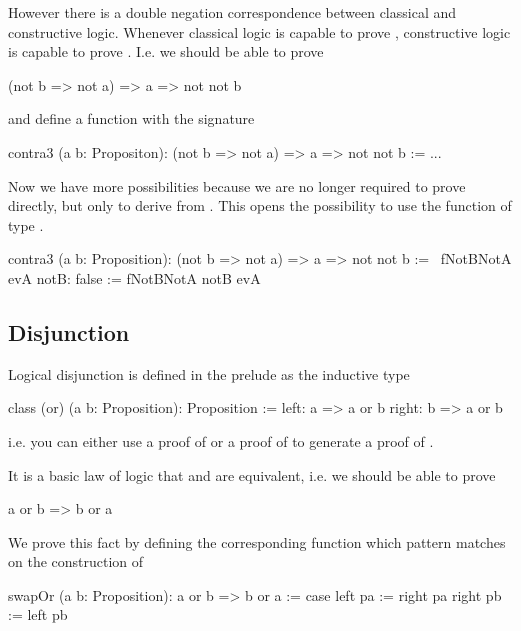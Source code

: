 However there is a double negation correspondence between classical and
constructive logic. Whenever classical logic is capable to prove ,
constructive logic is capable to prove . I.e. we should be able
to prove

\begin{alba}
  (not b => not a) => a => not not b
\end{alba}
and define a function with the signature

\begin{alba}
  contra3 (a b: Propositon): (not b => not a) => a => not not b :=
    ...
\end{alba}

Now we have more possibilities because we are no longer required to prove
 directly, but only to derive  from . This
opens the possibility to use the function of type .
%
\begin{alba}
    contra3 (a b: Proposition): (not b => not a) => a => not not b
    :=
        \   fNotBNotA evA notB: false :=
                fNotBNotA notB evA
\end{alba}






\subsection{Disjunction}

Logical disjunction is defined in the prelude as the inductive type
%
\begin{alba}
    class
        (or) (a b: Proposition): Proposition
    :=
        left:  a => a or b
        right: b => a or b
\end{alba}
%
i.e. you can either use a proof of  or a proof of  to generate
a proof of .

It is a basic law of logic that  and  are
equivalent, i.e. we should be able to prove
%
\begin{alba}
  a or b  =>  b or a
\end{alba}
%
We prove this fact by defining the corresponding function which pattern
matches on the construction of 
%
\begin{alba}
    swapOr (a b: Proposition): a or b => b or a
    :=
        case
            left pa  := right pa
            right pb := left pb
\end{alba}

